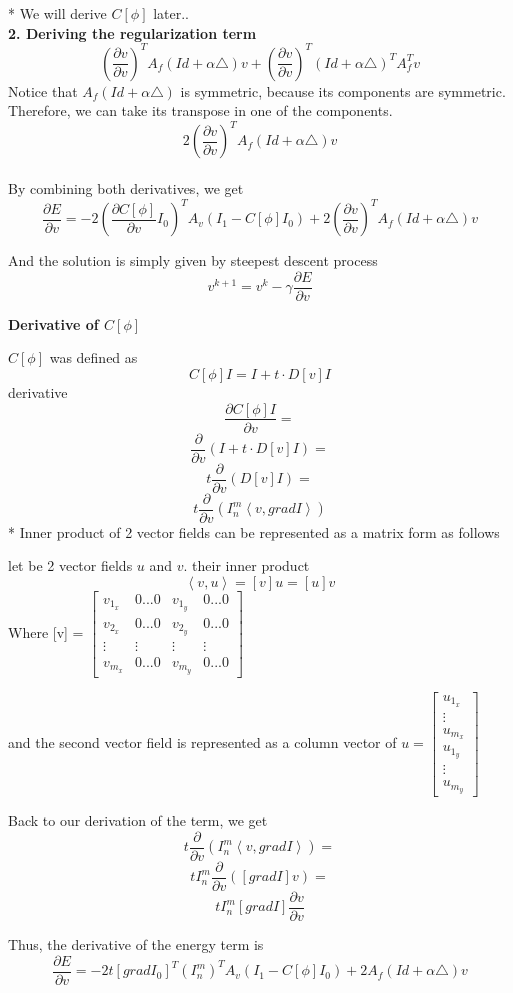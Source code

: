 \documentclass[12pt]{article}
\begin{document}
* We will derive $C[\phi]$ later..
\\


\textbf{2. Deriving the regularization term}
$$
\left(
\frac{\partial v}{\partial v}
\right) ^T
A_f (Id + \alpha \triangle) v +
\left(
\frac{\partial v}{\partial v}
\right) ^T
(Id + \alpha \triangle)^T A_f^T v 
$$
Notice that $ A_f (Id + \alpha \triangle) $ is symmetric, because its components are symmetric.
Therefore, we can take its transpose in one of the components.
$$ 
2 \left(
\frac{\partial v}{\partial v}
\right) ^T
A_f (Id + \alpha \triangle) v
$$
\\

By combining both derivatives, we get
$$ \frac{\partial E}{\partial v} =
-2 \left(  \frac{\partial C[\phi]}{\partial v} I_0  \right) ^T A_v (I_1 - C[\phi] I_0)
+
2 \left(
\frac{\partial v}{\partial v}
\right) ^T
A_f (Id + \alpha \triangle) v
$$

And the solution is simply given by steepest descent process
$$ v^{k+1} = v^k - \gamma
\frac{\partial E}{\partial v}
$$

\newpage
\textbf{Derivative of $C[\phi]$}

$C[\phi]$ was defined as
$$ C[\phi] I = I + t \cdot D[v] I $$
derivative
$$ \frac{\partial C[\phi] I}{\partial v} =
$$
$$
\frac{\partial}{\partial v}
\left(
I + t \cdot D[v] I
\right) =
$$
$$
t \frac{\partial}{\partial v}
\left(
D[v] I
\right) =
$$
$$
t \frac{\partial}{\partial v}
\left(
I_n^m \left\langle v , grad I \right \rangle
\right)
$$
* Inner product of 2 vector fields can be represented as a matrix form as follows

let be 2 vector fields $u$ and $v$. their inner product
$$ \left\langle
v,u
\right\rangle = [v]u = [u]v $$
Where [v] = $
\left[
\begin{array}{cccc}
v_{1_x} & 0...0 & v_{1_y} & 0...0 \\ 
v_{2_x} & 0...0 & v_{2_y} & 0...0 \\ 
\vdots & \vdots & \vdots & \vdots \\ 
v_{m_x} & 0...0 & v_{m_y} & 0...0
\end{array}
\right]
$

and the second vector field is represented as a column vector of $ 
u = \left[
\begin{array}{c}
u_{1_x} \\ 
\vdots \\ 
u_{m_x} \\ 
u_{1_y} \\ 
\vdots \\ 
u_{m_y}
\end{array} 
\right]
$


Back to our derivation of the term, we get
$$
t \frac{\partial}{\partial v}
\left(
I_n^m \left\langle v , grad I \right \rangle
\right) =
$$
$$
t I_n^m \frac{\partial}{\partial v}
\left(
\left[ grad I \right] v
\right) =
$$
$$
t I_n^m
\left[ grad I \right]
\frac{\partial v}{\partial v}
$$

Thus, the derivative of the energy term is
$$
\frac{\partial E}{\partial v} =
- 2 t
\left[
grad I_0
\right]^T
(I_n^m)^T
A_v
(I_1 -C[\phi] I_0)
+ 2 A_f (Id + \alpha \triangle)v
$$
\end{document}
